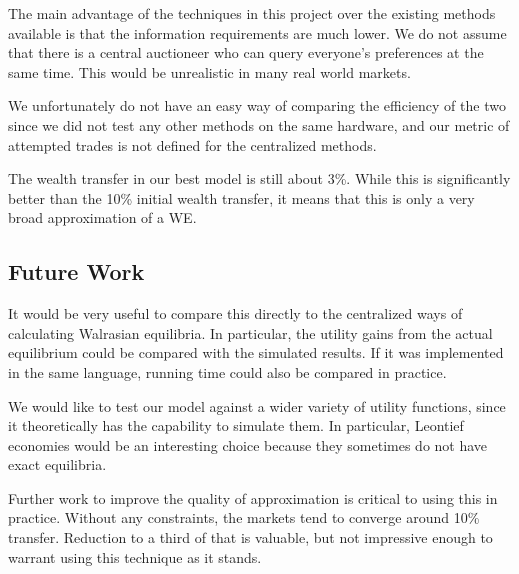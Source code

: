 \documentclass[12pt,a4paper,titlepage]{article}
\begin{document}
The main advantage of the techniques in this project over the existing methods available is that the information requirements are much lower. 
We do not assume that there is a central auctioneer who can query everyone's preferences at the same time.
This would be unrealistic in many real world markets.

We unfortunately do not have an easy way of comparing the efficiency of the two since we did not test any other methods on the same hardware, and our metric of attempted trades is not defined for the centralized methods.

The wealth transfer in our best model is still about 3\%.
While this is significantly better than the 10\% initial wealth transfer, it means that this is only a very broad approximation of a WE.





\subsection{Future Work}
It would be very useful to compare this directly to the centralized ways of calculating Walrasian equilibria.
In particular, the utility gains from the actual equilibrium could be compared with the simulated results.
If it was implemented in the same language, running time could also be compared in practice.

We would like to test our model against a wider variety of utility functions, since it theoretically has the capability to simulate them.
In particular, Leontief economies would be an interesting choice because they sometimes do not have exact equilibria.

Further work to improve the quality of approximation is critical to using this in practice.
Without any constraints, the markets tend to converge around 10\% transfer. 
Reduction to a third of that is valuable, but not impressive enough to warrant using this technique as it stands.
\end{document}
